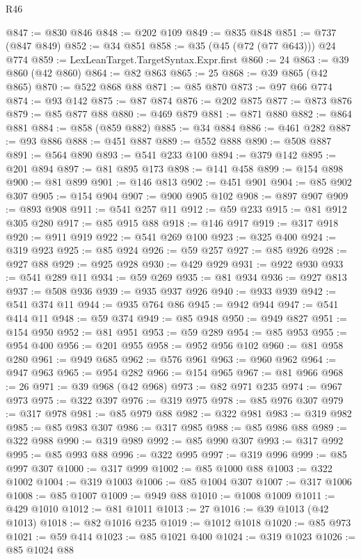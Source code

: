 \begin{lexlean}{R46}
\begin{coremodule}
@847 := @830 @846
@848 := @202 @109
@849 := @835 @848
@851 := @737 (@847 @849)
@852 := @34 @851
@858 := @35 (@45 (@72 (@77 @643))) @24 @774
@859 := LexLeanTarget.TargetSyntax.Expr.first
@860 := 24
@863 := @39 @860 (@42 @860)
@864 := @82 @863
@865 := 25
@868 := @39 @865 (@42 @865)
@870 := @522 @868 @88
@871 := @85 @870
@873 := @97 @66 @774
@874 := @93 @142
@875 := @87 @874
@876 := @202 @875
@877 := @873 @876
@879 := @85 @877 @88
@880 := @469 @879
@881 := @871 @880
@882 := @864 @881
@884 := @858 (@859 @882)
@885 := @34 @884
@886 := @461 @282
@887 := @93 @886
@888 := @451 @887
@889 := @552 @888
@890 := @508 @887
@891 := @564 @890
@893 := @541 @233 @100
@894 := @379 @142
@895 := @201 @894
@897 := @81 @895 @173
@898 := @141 @458
@899 := @154 @898
@900 := @81 @899
@901 := @146 @813
@902 := @451 @901
@904 := @85 @902 @307
@905 := @154 @904
@907 := @900 @905 @102
@908 := @897 @907
@909 := @893 @908
@911 := @541 @257 @11
@912 := @59 @233
@915 := @81 @912 @305 @280
@917 := @85 @915 @88
@918 := @146 @917
@919 := @317 @918
@920 := @911 @919
@922 := @541 @269 @100
@923 := @325 @400
@924 := @319 @923
@925 := @85 @924
@926 := @59 @257
@927 := @85 @926
@928 := @927 @88
@929 := @925 @928
@930 := @429 @929
@931 := @922 @930
@933 := @541 @289 @11
@934 := @59 @269
@935 := @81 @934
@936 := @927 @813
@937 := @508 @936
@939 := @935 @937 @926
@940 := @933 @939
@942 := @541 @374 @11
@944 := @935 @764 @86
@945 := @942 @944
@947 := @541 @414 @11
@948 := @59 @374
@949 := @85 @948
@950 := @949 @827
@951 := @154 @950
@952 := @81 @951
@953 := @59 @289
@954 := @85 @953
@955 := @954 @400
@956 := @201 @955
@958 := @952 @956 @102
@960 := @81 @958 @280
@961 := @949 @685
@962 := @576 @961
@963 := @960 @962
@964 := @947 @963
@965 := @954 @282
@966 := @154 @965
@967 := @81 @966
@968 := 26
@971 := @39 @968 (@42 @968)
@973 := @82 @971 @235
@974 := @967 @973
@975 := @322 @397
@976 := @319 @975
@978 := @85 @976 @307
@979 := @317 @978
@981 := @85 @979 @88
@982 := @322 @981
@983 := @319 @982
@985 := @85 @983 @307
@986 := @317 @985
@988 := @85 @986 @88
@989 := @322 @988
@990 := @319 @989
@992 := @85 @990 @307
@993 := @317 @992
@995 := @85 @993 @88
@996 := @322 @995
@997 := @319 @996
@999 := @85 @997 @307
@1000 := @317 @999
@1002 := @85 @1000 @88
@1003 := @322 @1002
@1004 := @319 @1003
@1006 := @85 @1004 @307
@1007 := @317 @1006
@1008 := @85 @1007
@1009 := @949 @88
@1010 := @1008 @1009
@1011 := @429 @1010
@1012 := @81 @1011
@1013 := 27
@1016 := @39 @1013 (@42 @1013)
@1018 := @82 @1016 @235
@1019 := @1012 @1018
@1020 := @85 @973
@1021 := @59 @414
@1023 := @85 @1021 @400
@1024 := @319 @1023
@1026 := @85 @1024 @88

\end{coremodule}
\end{lexlean}
